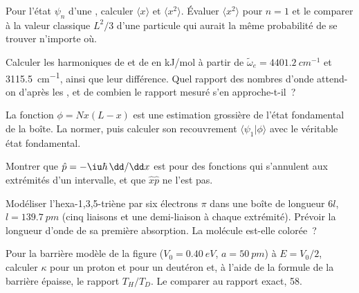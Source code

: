 \begin{exercise}[$\star\star$]\label{exo:b3:quantum-model-systems:5}
Pour l'état $\psi_n$ d'une , calculer $\langle x\rangle$ et
$\langle x^2\rangle$. Évaluer $\langle x^2\rangle$ pour $n = 1$ et le
comparer à la valeur classique $L^2/3$ d'une particule qui aurait la même
probabilité de se trouver n'importe où.
\end{exercise}

\begin{exercise}[$\star\star$]\label{exo:b3:quantum-model-systems:6}
Calculer les  harmoniques de  et de 
en \unit{kJ/mol} à partir de $\tilde\omega_e = \qty{4401.2}{cm^{-1}}$ et
\qty{3115.5}{cm^{-1}}, ainsi que leur différence. Quel rapport des nombres
d'onde attend-on d'après les , et de combien le rapport
mesuré s'en approche-t-il~?
\end{exercise}

\begin{exercise}[$\star\star$]\label{exo:b3:quantum-model-systems:7}
La fonction $\phi = Nx(L - x)$ est une estimation grossière de l'état
fondamental de la boîte. La normer, puis calculer son recouvrement
$\langle\psi_1|\phi\rangle$ avec le véritable état fondamental.
\end{exercise}

\begin{exercise}[$\star\star$]\label{exo:b3:quantum-model-systems:8}
Montrer que $\hat p = -\iu\hbar\,\dd/\dd x$ est  pour des
fonctions qui s'annulent aux extrémités d'un intervalle, et que
$\hat x\hat p$ ne l'est pas.
\end{exercise}

\begin{exercise}[$\star\star$]\label{exo:b3:quantum-model-systems:9}
Modéliser l'hexa-1,3,5-triène par six électrons $\pi$ dans une boîte de longueur $6l$, $l =
\qty{139.7}{pm}$ (cinq liaisons et une demi-liaison à chaque extrémité).
Prévoir la longueur d'onde de sa première absorption. La molécule
est-elle colorée~?
\end{exercise}

\begin{exercise}[$\star\star\star$]\label{exo:b3:quantum-model-systems:10}
Pour la barrière modèle de la figure ($V_0 = \qty{0.40}{eV}$, $a = \qty{50}{pm}$)
à $E = V_0/2$, calculer $\kappa$ pour un proton et pour un deutéron et, à
l'aide de la formule de la barrière épaisse, le rapport $T_H/T_D$. Le
comparer au rapport exact, 58.
\end{exercise}

